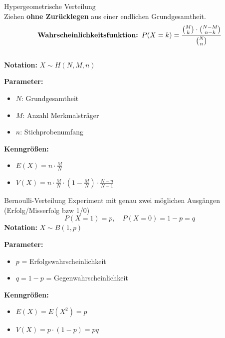 \begin{definition}{Hypergeometrische Verteilung}\\
Ziehen \textbf{ohne Zurücklegen} aus einer endlichen Grundgesamtheit.
\vspace{-2mm}\\
$$\text{\textbf{Wahrscheinlichkeitsfunktion: }}P(X=k) = \frac{\binom{M}{k} \cdot \binom{N-M}{n-k}}{\binom{N}{n}}$$
\vspace{-4mm}\\
\textbf{Notation:} $X \sim H(N,M,n)$

\begin{minipage}[t]{0.5\textwidth}
\textbf{Parameter:}
\begin{itemize}
    \item $N$: Grundgesamtheit
    \item $M$: Anzahl Merkmalsträger
    \item $n$: Stichprobenumfang
\end{itemize}
\end{minipage}
\begin{minipage}[t]{0.5\textwidth}
\textbf{Kenngrößen:}
\begin{itemize}
    \item $E(X) = n \cdot \frac{M}{N}$
    \item $V(X) = n \cdot \frac{M}{N} \cdot (1-\frac{M}{N}) \cdot \frac{N-n}{N-1}$
\end{itemize}
\end{minipage}
\end{definition}

\begin{definition}{Bernoulli-Verteilung}
Experiment mit genau zwei möglichen Ausgängen (Erfolg/Misserfolg bzw 1/0)
\vspace{-2mm}\\
$$P(X=1) = p, \quad P(X=0) = 1-p = q$$
\textbf{Notation:} $X \sim B(1,p)$

\begin{minipage}[t]{0.5\textwidth}
\textbf{Parameter:}
\begin{itemize}
    \item $p$ = Erfolgswahrscheinlichkeit
    \item $q = 1-p$ = Gegenwahrscheinlichkeit
\end{itemize}
\end{minipage}
\begin{minipage}[t]{0.5\textwidth}
\textbf{Kenngrößen:}
\begin{itemize}
    \item $E(X)=E(X^2)=p$
    \item $V(X)=p \cdot(1-p)=pq$
\end{itemize}
\end{minipage}
\end{definition}

